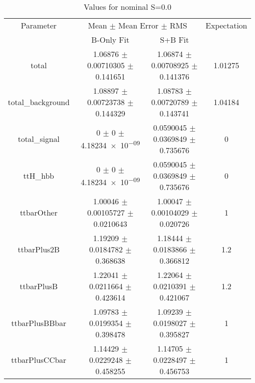 \begin{table}
\centering
\caption{Values for nominal S=0.0}
\begin{tabular}{cccc}
\toprule
Parameter & \multicolumn{2}{c}{Mean $\pm$ Mean Error $\pm$ RMS} & Expectation\\
 & B-Only Fit & S+B Fit & \\
\midrule
total & \num{1.06876} $\pm$ \num{0.00710305} $\pm$ \num{0.141651} & \num{1.06874} $\pm$ \num{0.00708925} $\pm$ \num{0.141376} & \num{1.01275}\\
total\_background & \num{1.08897} $\pm$ \num{0.00723738} $\pm$ \num{0.144329} & \num{1.08783} $\pm$ \num{0.00720789} $\pm$ \num{0.143741} & \num{1.04184}\\
total\_signal & \num{0} $\pm$ \num{0} $\pm$ \num{4.18234e-09} & \num{0.0590045} $\pm$ \num{0.0369849} $\pm$ \num{0.735676} & \num{0}\\
ttH\_hbb & \num{0} $\pm$ \num{0} $\pm$ \num{4.18234e-09} & \num{0.0590045} $\pm$ \num{0.0369849} $\pm$ \num{0.735676} & \num{0}\\
ttbarOther & \num{1.00046} $\pm$ \num{0.00105727} $\pm$ \num{0.0210643} & \num{1.00047} $\pm$ \num{0.00104029} $\pm$ \num{0.020726} & \num{1}\\
ttbarPlus2B & \num{1.19209} $\pm$ \num{0.0184782} $\pm$ \num{0.368638} & \num{1.18444} $\pm$ \num{0.0183866} $\pm$ \num{0.366812} & \num{1.2}\\
ttbarPlusB & \num{1.22041} $\pm$ \num{0.0211664} $\pm$ \num{0.423614} & \num{1.22064} $\pm$ \num{0.0210391} $\pm$ \num{0.421067} & \num{1.2}\\
ttbarPlusBBbar & \num{1.09783} $\pm$ \num{0.0199354} $\pm$ \num{0.398478} & \num{1.09239} $\pm$ \num{0.0198027} $\pm$ \num{0.395827} & \num{1}\\
ttbarPlusCCbar & \num{1.14429} $\pm$ \num{0.0229248} $\pm$ \num{0.458255} & \num{1.14705} $\pm$ \num{0.0228497} $\pm$ \num{0.456753} & \num{1}\\
\bottomrule
\end{tabular}
\end{table}